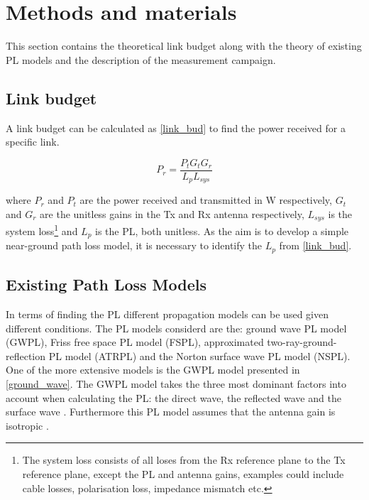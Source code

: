\section{Methods and materials}
This section contains the theoretical link budget along with the theory of existing PL models and the description of the measurement campaign.

\subsection{Link budget}
A link budget can be calculated as \eqref{link_bud} to find the power received for a specific link.

\begin{equation}
P_{r} = \frac{P_{t}G_{t}G_{r}}{L_{p}L_{sys}}
\label{link_bud}
\end{equation}

where $P_{r}$ and $P_{t}$ are the power received and transmitted in W respectively, $G_t$ and $G_r$ are the unitless gains in the Tx and Rx antenna respectively, $L_{sys}$ is the system loss\footnote{The system loss consists of all loses from the Rx reference plane to the Tx reference plane, except the PL and antenna gains, examples could include cable losses, polarisation loss, impedance mismatch etc.} and $L_{p}$ is the PL, both unitless. As the aim is to develop a simple near-ground path loss model, it is necessary to identify the $L_{p}$ from \eqref{link_bud}.


\subsection{Existing Path Loss Models}

In terms of finding the PL different propagation models can be used given different conditions. The PL models considerd are the: ground wave PL model (GWPL), Friss free space PL model (FSPL), approximated two-ray-ground-reflection PL model (ATRPL) and the Norton surface wave PL model (NSPL). One of the more extensive models is the GWPL model presented in \eqref{ground_wave}. The GWPL model takes the three most dominant factors into account when calculating the PL: the direct wave, the reflected wave and the surface wave \cite{Chong,Bullington}. Furthermore this PL model assumes that the antenna gain is isotropic \cite{Bullington}.  



